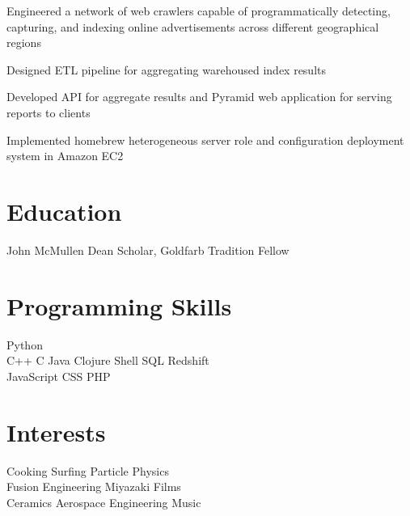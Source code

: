 \documentclass[]{deedy-resume-openfont}
\begin{document}
    \begin{tightemize}
        \item
            Engineered a network of web crawlers capable of programmatically
            detecting, capturing, and indexing online advertisements across
            different geographical regions
        \item
            Designed ETL pipeline for aggregating warehoused index results
        \item
            Developed API for aggregate results and Pyramid web application for
            serving reports to clients
        \item
            Implemented homebrew heterogeneous server role and configuration
            deployment system in Amazon EC2
    \end{tightemize}
\sectionsep

\section{Education}
    \begin{tightemize}
    \item
        John McMullen Dean Scholar, Goldfarb Tradition Fellow
    \end{tightemize}
\sectionsep

\begin{minipage}[t]{0.60\textwidth}
    \section{Programming Skills}
        Python \\
        C++ \textbullet{}
        C \textbullet{}
        Java \textbullet{}
        Clojure \textbullet{}
        Shell \textbullet{}
        SQL \textbullet{}
        Redshift \\
        JavaScript \textbullet{}
        CSS \textbullet{}
        PHP \\
\end{minipage}
\hfill
\begin{minipage}[t]{0.39\textwidth}
    \section{Interests}
        Cooking \textbullet{}
        Surfing \textbullet{}
        Particle Physics \\
        Fusion Engineering \textbullet{}
        Miyazaki Films \\
        Ceramics \textbullet{}
        Aerospace Engineering \textbullet{}
        Music 
\end{minipage}
\end{document}
